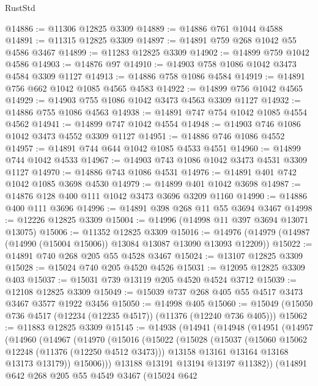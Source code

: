 \begin{lexlean}{RustStd}
\begin{coremodule}
{{{{{{{{{{{{{{{{{{{@14886 := @11306 @12825 @3309
@14889 := @14886 @761 @1044 @4588
@14891 := @11315 @12825 @3309
@14897 := @14891 @759 @268 @1042 @55 @4586 @3467
@14899 := @11283 @12825 @3309
@14902 := @14899 @759 @1042 @4586
@14903 := @14876 @97
@14910 := @14903 @758 @1086 @1042 @3473 @4584 @3309 @1127
@14913 := @14886 @758 @1086 @4584
@14919 := @14891 @756 @662 @1042 @1085 @4565 @4583
@14922 := @14899 @756 @1042 @4565
@14929 := @14903 @755 @1086 @1042 @3473 @4563 @3309 @1127
@14932 := @14886 @755 @1086 @4563
@14938 := @14891 @747 @754 @1042 @1085 @4554 @4562
@14941 := @14899 @747 @1042 @4554
@14948 := @14903 @746 @1086 @1042 @3473 @4552 @3309 @1127
@14951 := @14886 @746 @1086 @4552
@14957 := @14891 @744 @644 @1042 @1085 @4533 @4551
@14960 := @14899 @744 @1042 @4533
@14967 := @14903 @743 @1086 @1042 @3473 @4531 @3309 @1127
@14970 := @14886 @743 @1086 @4531
@14976 := @14891 @401 @742 @1042 @1085 @3698 @4530
@14979 := @14899 @401 @1042 @3698
@14987 := @14876 @128 @400 @111 @1042 @3473 @3696 @3209 @1160
@14990 := @14886 @400 @111 @3696
@14996 := @14891 @398 @268 @11 @55 @3694 @3467
@14998 := @12226 @12825 @3309
@15004 := @14996 (@14998 @11 @397 @3694 @13071 @13075)
@15006 := @11352 @12825 @3309
@15016 := @14976 (@14979 (@14987 (@14990 (@15004 @15006)) @13084 @13087 @13090 @13093 @12209))
@15022 := @14891 @740 @268 @205 @55 @4528 @3467
@15024 := @13107 @12825 @3309
@15028 := @15024 @740 @205 @4520 @4526
@15031 := @12095 @12825 @3309 @403
@15037 := @15031 @739 @13119 @205 @4520 @4524 @3712
@15039 := @12108 @12825 @3309
@15049 := @15039 @737 @268 @405 @55 @4517 @3473 @3467 @3577 @1922 @3456
@15050 := @14998 @405
@15060 := @15049 (@15050 @736 @4517 (@12234 (@12235 @4517)) (@11376 (@12240 @736 @405)))
@15062 := @11883 @12825 @3309
@15145 := @14938
    (@14941
      (@14948
        (@14951
          (@14957
            (@14960
              (@14967
                (@14970
                  (@15016
                    (@15022
                      (@15028
                        (@15037
                          (@15060 @15062 @12248 (@11376 (@12250 @4512 @3473)))
                          @13158
                          @13161
                          @13164
                          @13168
                          @13173
                          @13179))
                      @15006)))
                @13188
                @13191
                @13194
                @13197
                @11382))
            (@14891
              @642
              @268
              @205
              @55
              @4549
              @3467
              (@15024
                @642
}}}}}}}}}}}}}}}}}}}
\end{coremodule}
\end{lexlean}
